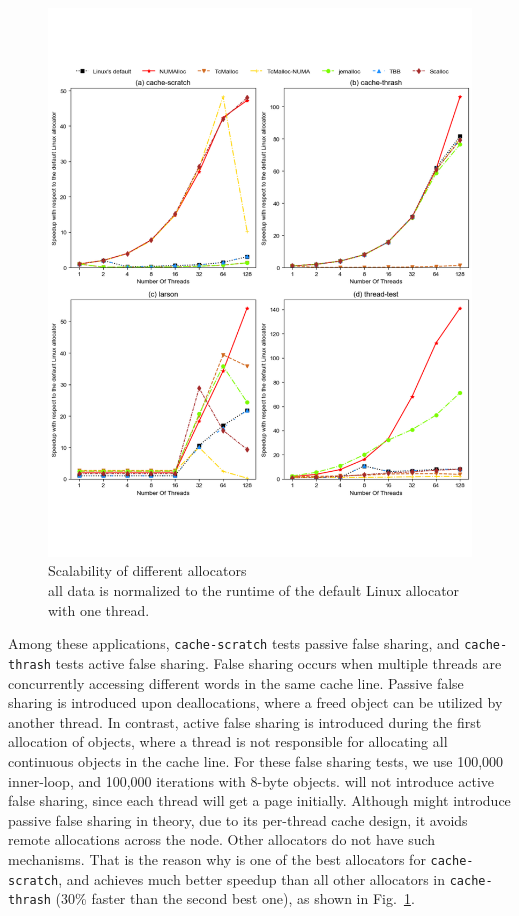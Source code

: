  
\begin{figure}[!ht]
    \centering
    \includegraphics[width=\textwidth]{figure/sythentic-scalobility.pdf}
    \caption{Scalability of different allocators\\  all data is normalized to the runtime of the default Linux allocator with one thread.}
    \label{sythentic-scalability}
\end{figure}

Among these applications, \texttt{cache-scratch} tests passive false sharing, and \texttt{cache-thrash} tests active false sharing. False sharing occurs when multiple threads are concurrently accessing different words in the same cache line. 
Passive false sharing is introduced upon deallocations, where a freed object can be utilized by another thread. In contrast, active false sharing is introduced during the first allocation of objects, where a thread is not responsible for allocating all continuous objects in the cache line. For these false sharing tests, we use 100,000 inner-loop, and 100,000 iterations with 8-byte objects. \NM{} will not introduce active false sharing, since each thread will get a page initially. 
 Although \NM{} might introduce passive false sharing in theory, due to its per-thread cache design, it avoids remote allocations across the node. Other allocators do not have such mechanisms. That is the reason why \NM{} is one of the best allocators for
 \texttt{cache-scratch}, and achieves much better speedup than all other allocators in \texttt{cache-thrash} (30\% faster than the second best one), as shown in Fig.~\ref{sythentic-scalability}.  

